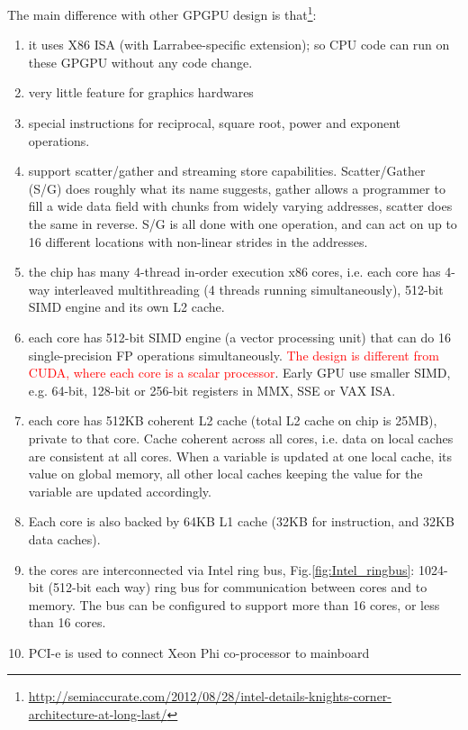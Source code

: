 The main difference with other GPGPU design is
that\footnote{\url{http://semiaccurate.com/2012/08/28/intel-details-knights-corner-architecture-at-long-last/}}:
\begin{enumerate}
  \item it uses X86 ISA (with Larrabee-specific extension); so CPU code can run
  on these GPGPU without any code change.
   
  \item very little feature for graphics hardwares
  
  \item special instructions for reciprocal, square root, power and exponent 
operations.

  \item support scatter/gather and streaming store capabilities. Scatter/Gather
  (S/G) does roughly what its name suggests, gather allows a programmer to fill
  a wide data field with chunks from widely varying addresses, scatter does the
  same in reverse. S/G is all done with one operation, and can act on up to 16
  different locations with non-linear strides in the addresses. 
  
  \item the chip has many 4-thread in-order execution x86 cores, i.e. each core
  has 4-way interleaved multithreading (4 threads running simultaneously), 
  512-bit SIMD engine and its own L2 cache.
  
  \item each core has 512-bit SIMD engine (a vector processing unit) that can
  do 16 single-precision FP operations simultaneously. \textcolor{red}{The
  design is different from CUDA, where each core is a scalar processor}. Early
  GPU use smaller SIMD, e.g. 64-bit, 128-bit or 256-bit registers in MMX, SSE
  or VAX ISA.
  
  \item each core has 512KB coherent L2 cache (total L2 cache on chip is 25MB),
  private to that core.
  Cache coherent across all cores, i.e. data on local caches are consistent at
  all cores. When a variable is updated at one local cache, its value on global
  memory, all other local caches keeping the value for the variable are updated
  accordingly.
   
  \item Each core is also backed by 64KB L1 cache (32KB for instruction, and
  32KB data caches).

  \item the cores are interconnected via Intel ring bus,
  Fig.\ref{fig:Intel_ringbus}:
  1024-bit (512-bit each way) ring bus for communication between cores and to
  memory. The bus can be configured to support more than 16 cores, or less than
  16 cores.
  
  \item PCI-e is used to connect Xeon Phi co-processor to mainboard
\end{enumerate}

